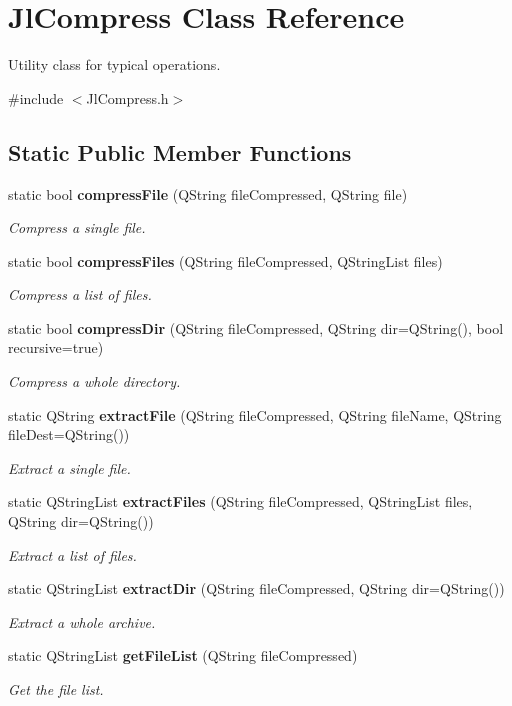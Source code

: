 \section{Jl\-Compress Class Reference}
\label{classJlCompress}


Utility class for typical operations.  




{\ttfamily \#include $<$Jl\-Compress.\-h$>$}

\subsection*{Static Public Member Functions}
\begin{DoxyCompactItemize}
\item 
static bool {\bf compress\-File} (Q\-String file\-Compressed, Q\-String file)
\begin{DoxyCompactList}\small\item\em Compress a single file. \end{DoxyCompactList}\item 
static bool {\bf compress\-Files} (Q\-String file\-Compressed, Q\-String\-List files)
\begin{DoxyCompactList}\small\item\em Compress a list of files. \end{DoxyCompactList}\item 
static bool {\bf compress\-Dir} (Q\-String file\-Compressed, Q\-String dir=Q\-String(), bool recursive=true)
\begin{DoxyCompactList}\small\item\em Compress a whole directory. \end{DoxyCompactList}\item 
static Q\-String {\bf extract\-File} (Q\-String file\-Compressed, Q\-String file\-Name, Q\-String file\-Dest=Q\-String())
\begin{DoxyCompactList}\small\item\em Extract a single file. \end{DoxyCompactList}\item 
static Q\-String\-List {\bf extract\-Files} (Q\-String file\-Compressed, Q\-String\-List files, Q\-String dir=Q\-String())
\begin{DoxyCompactList}\small\item\em Extract a list of files. \end{DoxyCompactList}\item 
static Q\-String\-List {\bf extract\-Dir} (Q\-String file\-Compressed, Q\-String dir=Q\-String())
\begin{DoxyCompactList}\small\item\em Extract a whole archive. \end{DoxyCompactList}\item 
static Q\-String\-List {\bf get\-File\-List} (Q\-String file\-Compressed)
\begin{DoxyCompactList}\small\item\em Get the file list. \end{DoxyCompactList}\end{DoxyCompactItemize}



